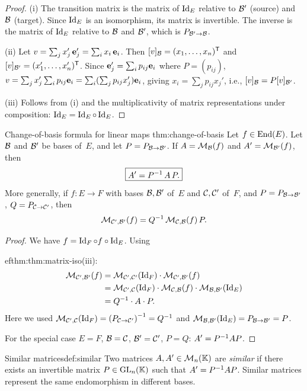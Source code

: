 \begin{proof}
(i) The transition matrix is the matrix of $\operatorname{Id}_E$ relative to
${\mathcal{B}}'$ (source) and ${\mathcal{B}}$ (target). Since $\operatorname{Id}_E$ is an isomorphism,
its matrix is invertible. The inverse is the matrix of $\operatorname{Id}_E$ relative
to ${\mathcal{B}}$ and ${\mathcal{B}}'$, which is $P_{{\mathcal{B}}'\to{\mathcal{B}}}$.

(ii) Let $v = \sum_j x_j'\,\mathbf{e}_{j}' = \sum_i x_i\,\mathbf{e}_{i}$. Then
$[v]_{\mathcal{B}} = (x_1,\ldots,x_n)^{\mathsf{T}}$ and
$[v]_{{\mathcal{B}}'} = (x_1',\ldots,x_n')^{\mathsf{T}}$. Since
$\mathbf{e}_{j}' = \sum_i p_{ij}\mathbf{e}_{i}$ where $P = (p_{ij})$,
$v = \sum_j x_j' \sum_i p_{ij}\mathbf{e}_{i} = \sum_i(\sum_j p_{ij}x_j')\mathbf{e}_{i}$,
giving $x_i = \sum_j p_{ij}x_j'$, i.e., $[v]_{\mathcal{B}} = P[v]_{{\mathcal{B}}'}$.

(iii) Follows from (i) and the multiplicativity of matrix
representations under composition:
$\operatorname{Id}_E = \operatorname{Id}_E\circ\operatorname{Id}_E$.
\end{proof}

\begin{theorem}{Change-of-basis formula for linear maps}%
{thm:change-of-basis}
Let $f\in\operatorname{End}(E)$. Let ${\mathcal{B}}$ and ${\mathcal{B}}'$ be bases of~$E$, and let
$P = P_{{\mathcal{B}}\to{\mathcal{B}}'}$. If $A = \mathcal{M}_{\mathcal{B}}(f)$ and $A' = \mathcal{M}_{{\mathcal{B}}'}(f)$,
then
\[
  \boxed{A' = {P}^{-1}\, A\, P.}
\]
More generally, if $f\colon E\to F$ with bases ${\mathcal{B}},{\mathcal{B}}'$ of~$E$ and
${\mathcal{C}},{\mathcal{C}}'$ of~$F$, and $P = P_{{\mathcal{B}}\to{\mathcal{B}}'}$, $Q = P_{{\mathcal{C}}\to{\mathcal{C}}'}$, then
\[
  \mathcal{M}_{{\mathcal{C}}',{\mathcal{B}}'}(f) = {Q}^{-1}\,\mathcal{M}_{{\mathcal{C}},{\mathcal{B}}}(f)\,P.
\]
\end{theorem}

\begin{proof}
We have $f = \operatorname{Id}_F\circ f\circ\operatorname{Id}_E$. Using

ef{thm:thm:matrix-iso}(iii):
\begin{align*}
  \mathcal{M}_{{\mathcal{C}}',{\mathcal{B}}'}(f)
  &= \mathcal{M}_{{\mathcal{C}}',{\mathcal{C}}'}(\operatorname{Id}_F)\cdot\mathcal{M}_{{\mathcal{C}}',{\mathcal{B}}'}(f) \\
  &= \mathcal{M}_{{\mathcal{C}}',{\mathcal{C}}}(\operatorname{Id}_F)\cdot\mathcal{M}_{{\mathcal{C}},{\mathcal{B}}}(f)\cdot
    \mathcal{M}_{{\mathcal{B}},{\mathcal{B}}'}(\operatorname{Id}_E) \\
  &= {Q}^{-1}\cdot A \cdot P.
\end{align*}
Here we used $\mathcal{M}_{{\mathcal{C}}',{\mathcal{C}}}(\operatorname{Id}_F) = {(P_{{\mathcal{C}}\to{\mathcal{C}}'})}^{-1} = {Q}^{-1}$
and $\mathcal{M}_{{\mathcal{B}},{\mathcal{B}}'}(\operatorname{Id}_E) = P_{{\mathcal{B}}\to{\mathcal{B}}'} = P$.

For the special case $E = F$, ${\mathcal{B}} = {\mathcal{C}}$, ${\mathcal{B}}' = {\mathcal{C}}'$, $P = Q$:
$A' = {P}^{-1}AP$.
\end{proof}

\begin{definition}{Similar matrices}{def:similar}
Two matrices $A,A'\in\mathcal{M}_n({\mathbb{K}})$ are \emph{similar} if there exists an
invertible matrix $P\in\operatorname{GL}_n({\mathbb{K}})$ such that $A' = {P}^{-1}AP$. Similar
matrices represent the same endomorphism in different bases.
\end{definition}

